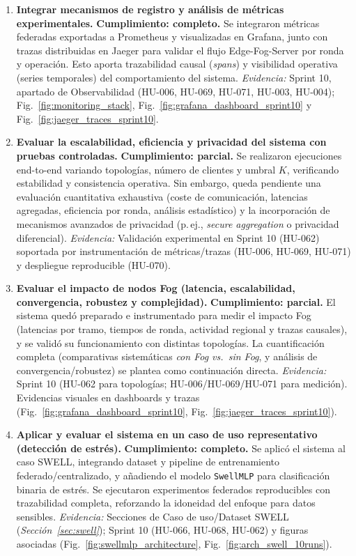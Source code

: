 \documentclass{report}
\begin{document}
\begin{enumerate}
\item \textbf{Integrar mecanismos de registro y análisis de métricas experimentales.}  
\textbf{Cumplimiento: completo.} Se integraron métricas federadas exportadas a Prometheus y visualizadas en Grafana, junto con trazas distribuidas en Jaeger para validar el flujo Edge-Fog-Server por ronda y operación. Esto aporta trazabilidad causal (\textit{spans}) y visibilidad operativa (series temporales) del comportamiento del sistema.  
\textit{Evidencia:} Sprint 10, apartado de Observabilidad (HU-006, HU-069, HU-071, HU-003, HU-004); Fig.~\ref{fig:monitoring_stack}, Fig.~\ref{fig:grafana_dashboard_sprint10} y Fig.~\ref{fig:jaeger_traces_sprint10}.  

\item \textbf{Evaluar la escalabilidad, eficiencia y privacidad del sistema con pruebas controladas.}  
\textbf{Cumplimiento: parcial.} Se realizaron ejecuciones end-to-end variando topologías, número de clientes y umbral $K$, verificando estabilidad y consistencia operativa. Sin embargo, queda pendiente una evaluación cuantitativa exhaustiva (coste de comunicación, latencias agregadas, eficiencia por ronda, análisis estadístico) y la incorporación de mecanismos avanzados de privacidad (p.\,ej., \textit{secure aggregation} o privacidad diferencial).  
\textit{Evidencia:} Validación experimental en Sprint 10 (HU-062) soportada por instrumentación de métricas/trazas (HU-006, HU-069, HU-071) y despliegue reproducible (HU-070).

\item \textbf{Evaluar el impacto de nodos Fog (latencia, escalabilidad, convergencia, robustez y complejidad).}  
\textbf{Cumplimiento: parcial.} El sistema quedó preparado e instrumentado para medir el impacto Fog (latencias por tramo, tiempos de ronda, actividad regional y trazas causales), y se validó su funcionamiento con distintas topologías. La cuantificación completa (comparativas sistemáticas \emph{con Fog vs.\ sin Fog}, y análisis de convergencia/robustez) se plantea como continuación directa.  
\textit{Evidencia:} Sprint 10 (HU-062 para topologías; HU-006/HU-069/HU-071 para medición). Evidencias visuales en dashboards y trazas (Fig.~\ref{fig:grafana_dashboard_sprint10}, Fig.~\ref{fig:jaeger_traces_sprint10}).

\item \textbf{Aplicar y evaluar el sistema en un caso de uso representativo (detección de estrés).}  
\textbf{Cumplimiento: completo.} Se aplicó el sistema al caso SWELL, integrando dataset y pipeline de entrenamiento federado/centralizado, y añadiendo el modelo \texttt{SwellMLP} para clasificación binaria de estrés. Se ejecutaron experimentos federados reproducibles con trazabilidad completa, reforzando la idoneidad del enfoque para datos sensibles.  
\textit{Evidencia:} Secciones de Caso de uso/Dataset SWELL (\textit{Sección~\ref{sec:swell}}); Sprint 10 (HU-066, HU-068, HU-062) y figuras asociadas (Fig.~\ref{fig:swellmlp_architecture}, Fig.~\ref{fig:arch_swell_10runs}).

\end{enumerate}
\end{document}
